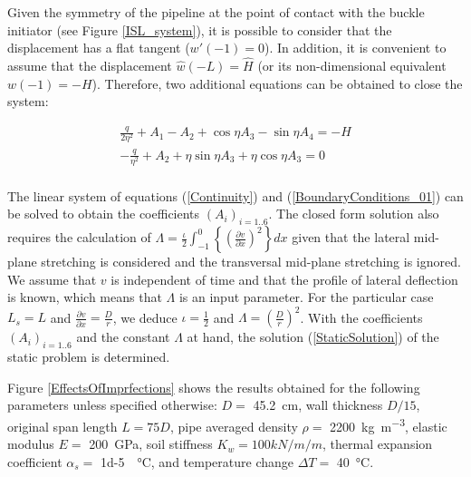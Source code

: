 \documentclass[3p,doublespacing,authoryear,11pt]{elsarticle} %
\begin{document}
Given the symmetry of the pipeline at the point of contact with the buckle initiator (see Figure \ref{ISL_system}), it is possible to consider that the displacement has a flat tangent ($w'(-1) =  0$). In addition, it is convenient to assume that the displacement $\hat{w}(-L) =  \hat{H}$ (or its non-dimensional equivalent  $w(-1) =  -H$). Therefore, two additional equations can be obtained to close the system:

\begin{equation}\label{BoundaryConditions_01}
 \begin{array}{l } 
\displaystyle   \frac{q}{2 \eta^2} + A_1 -A_2 + \cos \eta A_3 -  \sin \eta A_4 = -H \\
\displaystyle   - \frac{q}{\eta^2} + A_2 + \eta  \sin \eta A_3 + \eta  \cos \eta A_3 = 0 \\ 
  \end{array}  
\end{equation} 

The linear system of equations (\ref{Continuity}) and (\ref{BoundaryConditions_01}) can be solved to obtain the coefficients $(A_i)_{i=1..6}$. The closed form solution also requires the calculation of $\displaystyle \Lambda = \frac{\iota}{2} \int_{-1}^0  \left\{\left( \frac{\partial v}{\partial x}  \right)^2 \right\} dx $ given that the lateral mid-plane stretching is considered and the transversal mid-plane stretching is ignored. We assume that $v$ is independent of time and that the profile of lateral deflection is known, which means that $\Lambda$ is an input parameter. For the particular case $L_s=L$ and $\frac{\partial v}{\partial x} = \frac{D}{r}$, we deduce $\iota = \frac{1}{2}$ and  $\Lambda =  \left(\frac{D}{r}\right)^2$. With the coefficients $(A_i)_{i=1..6}$ and the constant $\Lambda$ at hand, the solution (\ref{StaticSolution}) of the static problem is determined. 

Figure \ref{EffectsOfImprfections} shows the results obtained for the following parameters unless specified otherwise: $D =$ \SI{45.2}{\centi\meter}, wall thickness $D/15$, original span length $L = 75D$, pipe averaged density $\rho =$ \SI{2200}{\kilogram\per\meter\cubed}, elastic modulus $E =$ \SI{200}{\giga\pascal}, soil stiffness $K_w = 100 kN/m/m$, thermal expansion coefficient $\alpha_s =$ \SI{ 1d-5}{\per\celsius}, and temperature change $\Delta T =$ \SI{40}{\celsius}.
\end{document}
